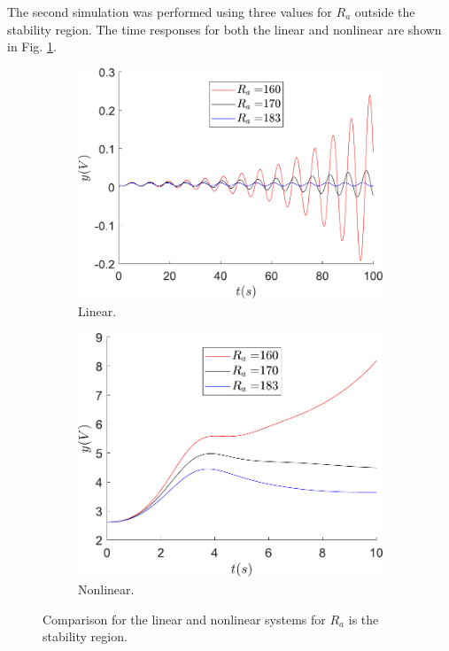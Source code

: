 	The second simulation was performed using three values for $R_a$ outside the stability region. The time responses for both the linear and nonlinear are shown in Fig. \ref{fig:Ra_Fuera}. 
	
	\begin{figure}[H]
        \centering
        \begin{subfigure}[b]{0.475\textwidth}
            \centering
            \includegraphics[scale=0.4]{figs/stab_Ra/Cambio_Ra_l_afuera.pdf}
            \caption{Linear.}
        \end{subfigure}
        \vskip0.1cm
        \begin{subfigure}[b]{0.475\textwidth}   
            \centering 
            \includegraphics[scale=0.4]{figs/stab_Ra/Cambio_Ra_nl_afuera.pdf}
            \caption{Nonlinear.}
        \end{subfigure}
        \caption{Comparison for the linear and nonlinear systems for $R_a$ is the stability region.}
        \label{fig:Ra_Fuera}
	\end{figure}
	
